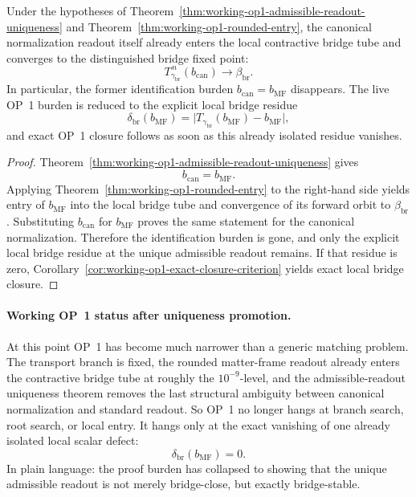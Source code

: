 \begin{corollary}
\label{cor:working-op1-structural-promotion}
Under the hypotheses of Theorem~\ref{thm:working-op1-admissible-readout-uniqueness} and Theorem~\ref{thm:working-op1-rounded-entry}, the canonical normalization readout itself already enters the local contractive bridge tube and converges to the distinguished bridge fixed point:
\[
  T_{\gamma_{\mathrm{br}}}^{\,n}(b_{\mathrm{can}})\longrightarrow \beta_{\mathrm{br}}.
\]
In particular, the former identification burden \(b_{\mathrm{can}}=b_{\mathrm{MF}}\) disappears. The live OP~1 burden is reduced to the explicit local bridge residue
\[
  \delta_{\mathrm{br}}(b_{\mathrm{MF}})=\bigl|T_{\gamma_{\mathrm{br}}}(b_{\mathrm{MF}})-b_{\mathrm{MF}}\bigr|,
\]
and exact OP~1 closure follows as soon as this already isolated residue vanishes.
\end{corollary}

\begin{proof}
Theorem~\ref{thm:working-op1-admissible-readout-uniqueness} gives
\[
  b_{\mathrm{can}}=b_{\mathrm{MF}}.
\]
Applying Theorem~\ref{thm:working-op1-rounded-entry} to the right-hand side yields entry of \(b_{\mathrm{MF}}\) into the local bridge tube and convergence of its forward orbit to \(\beta_{\mathrm{br}}\). Substituting \(b_{\mathrm{can}}\) for \(b_{\mathrm{MF}}\) proves the same statement for the canonical normalization. Therefore the identification burden is gone, and only the explicit local bridge residue at the unique admissible readout remains. If that residue is zero, Corollary~\ref{cor:working-op1-exact-closure-criterion} yields exact local bridge closure.
\end{proof}

\paragraph{Working OP~1 status after uniqueness promotion.}
At this point OP~1 has become much narrower than a generic matching problem. The transport branch is fixed, the rounded matter-frame readout already enters the contractive bridge tube at roughly the \(10^{-9}\)-level, and the admissible-readout uniqueness theorem removes the last structural ambiguity between canonical normalization and standard readout. So OP~1 no longer hangs at branch search, root search, or local entry. It hangs only at the exact vanishing of one already isolated local scalar defect:
\[
  \delta_{\mathrm{br}}(b_{\mathrm{MF}})=0.
\]
In plain language: the proof burden has collapsed to showing that the unique admissible readout is not merely bridge-close, but exactly bridge-stable.

